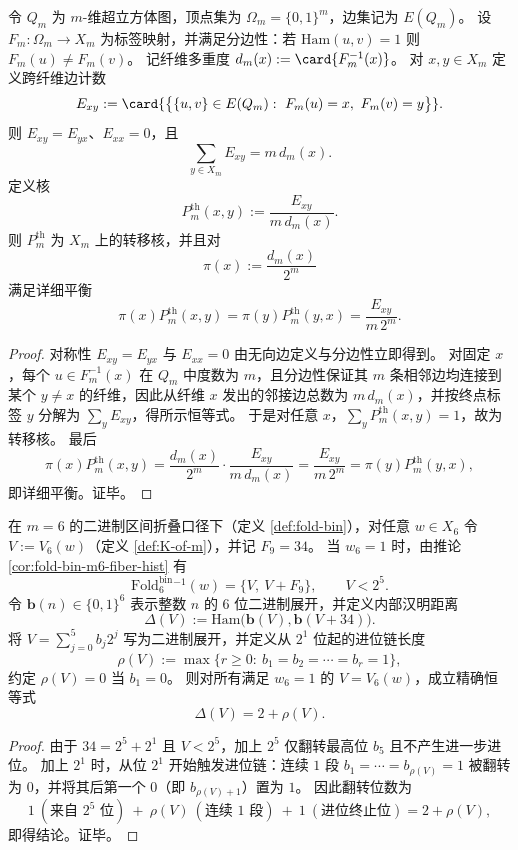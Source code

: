 \begin{proposition}\label{prop:fold-thermal-kernel-from-edge-count}
令 \(Q_m\) 为 \(m\)-维超立方体图，顶点集为 \(\Omega_m=\{0,1\}^m\)，边集记为 \(E(Q_m)\)。
设 \(F_m:\Omega_m\to X_m\) 为标签映射，并满足分边性：若 \(\mathrm{Ham}(u,v)=1\) 则 \(F_m(u)\neq F_m(v)\)。
记纤维多重度
\(
d_m(x):=\card{F_m^{-1}(x)}
\)。
对 \(x,y\in X_m\) 定义跨纤维边计数
\[
E_{xy}:=\card{\bigl\{\{u,v\}\in E(Q_m):\ F_m(u)=x,\ F_m(v)=y\bigr\}}.
\]
则 \(E_{xy}=E_{yx}\)、\(E_{xx}=0\)，且
\[
\sum_{y\in X_m}E_{xy}=m\,d_m(x).
\]
定义核
\[
P_m^{\mathrm{th}}(x,y):=\frac{E_{xy}}{m\,d_m(x)}.
\]
则 \(P_m^{\mathrm{th}}\) 为 \(X_m\) 上的转移核，并且对
\[
\pi(x):=\frac{d_m(x)}{2^m}
\]
满足详细平衡
\[
\pi(x)P_m^{\mathrm{th}}(x,y)=\pi(y)P_m^{\mathrm{th}}(y,x)=\frac{E_{xy}}{m\,2^m}.
\]
\end{proposition}

\begin{proof}
对称性 \(E_{xy}=E_{yx}\) 与 \(E_{xx}=0\) 由无向边定义与分边性立即得到。
对固定 \(x\)，每个 \(u\in F_m^{-1}(x)\) 在 \(Q_m\) 中度数为 \(m\)，且分边性保证其 \(m\) 条相邻边均连接到某个 \(y\neq x\) 的纤维，因此从纤维 \(x\) 发出的邻接边总数为 \(m\,d_m(x)\)，并按终点标签 \(y\) 分解为 \(\sum_y E_{xy}\)，得所示恒等式。
于是对任意 \(x\)，\(\sum_y P_m^{\mathrm{th}}(x,y)=1\)，故为转移核。
最后
\[
\pi(x)P_m^{\mathrm{th}}(x,y)
=\frac{d_m(x)}{2^m}\cdot\frac{E_{xy}}{m\,d_m(x)}
=\frac{E_{xy}}{m\,2^m}
=\pi(y)P_m^{\mathrm{th}}(y,x),
\]
即详细平衡。证毕。
\end{proof}

\begin{theorem}[dyadic uplift 位移的进位控制：\(m=6\) 的纤维内汉明距离闭式]\label{thm:foldbin6-carry-hamming-distance}
在 \(m=6\) 的二进制区间折叠口径下（定义 \ref{def:fold-bin}），对任意 \(w\in X_6\) 令
\(
V:=V_6(w)
\)（定义 \ref{def:K-of-m}），并记 \(F_9=34\)。
当 \(w_6=1\) 时，由推论 \ref{cor:fold-bin-m6-fiber-hist} 有
\[
\mathrm{Fold}^{\mathrm{bin}}_6{}^{-1}(w)=\{V,\ V+F_9\},
\qquad
V<2^5.
\]
令 \(\mathbf b(n)\in\{0,1\}^6\) 表示整数 \(n\) 的 \(6\) 位二进制展开，并定义内部汉明距离
\[
\Delta(V):=\mathrm{Ham}\bigl(\mathbf b(V),\mathbf b(V+34)\bigr).
\]
将 \(V=\sum_{j=0}^{5}b_j2^j\) 写为二进制展开，并定义从 \(2^1\) 位起的进位链长度
\[
\rho(V):=\max\{r\ge 0:\ b_1=b_2=\cdots=b_r=1\},
\]
约定 \(\rho(V)=0\) 当 \(b_1=0\)。
则对所有满足 \(w_6=1\) 的 \(V=V_6(w)\)，成立精确恒等式
\[
\Delta(V)=2+\rho(V).
\]
\end{theorem}

\begin{proof}
由于 \(34=2^5+2^1\) 且 \(V<2^5\)，加上 \(2^5\) 仅翻转最高位 \(b_5\) 且不产生进一步进位。
加上 \(2^1\) 时，从位 \(2^1\) 开始触发进位链：连续 \(1\) 段 \(b_1=\cdots=b_{\rho(V)}=1\) 被翻转为 \(0\)，并将其后第一个 \(0\)（即 \(b_{\rho(V)+1}\)）置为 \(1\)。
因此翻转位数为
\[
1\ (\text{来自 }2^5\text{ 位})\ +\ \rho(V)\ (\text{连续 }1\text{ 段})\ +\ 1\ (\text{进位终止位})
=2+\rho(V),
\]
即得结论。证毕。
\end{proof}

